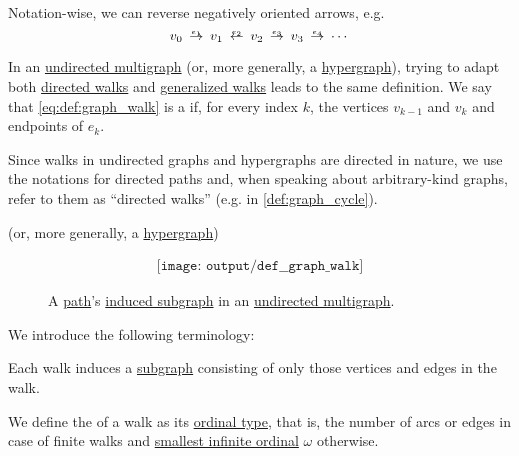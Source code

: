 \begin{definition}
\begin{thmenum}[series=def:graph_walk]
    Notation-wise, we can reverse negatively oriented arrows, e.g.
    \begin{equation*}
      v_0 \reloset {e_1} \to v_1 \reloset {e_2} \leftarrow v_2 \reloset {e_3} \to v_3 \reloset {e_4} \to \cdots
    \end{equation*}

     In an \hyperref[def:hypergraph/multigraph]{undirected multigraph} (or, more generally, a \hyperref[def:hypergraph]{hypergraph}), trying to adapt both \hyperref[def:graph_walk/directed]{directed walks} and \hyperref[def:graph_walk/generalized]{generalized walks} leads to the same definition. We say that \eqref{eq:def:graph_walk} is a  if, for every index \( k \), the vertices \( v_{k-1} \) and \( v_k \) and endpoints of \( e_k \).

    Since walks in undirected graphs and hypergraphs are directed in nature, we use the notations for directed paths and, when speaking about arbitrary-kind graphs, refer to them as \enquote{directed walks} (e.g. in \cref{def:graph_cycle}).

    (or, more generally, a \hyperref[def:hypergraph]{hypergraph})
  \end{thmenum}

  \begin{figure}[!ht]
    \begin{equation}\label{eq:fig:def:graph_walk}
      \begin{aligned}
        \texttt{[image: output/def\_\_graph\_walk]}
      \end{aligned}
    \end{equation}
    \caption{A \hyperref[def:graph_walk/path]{path}'s \hyperref[def:graph_walk/subgraph]{induced subgraph} in an \hyperref[def:hypergraph/multigraph]{undirected multigraph}.}\label{fig:def:graph_walk}
  \end{figure}

  We introduce the following terminology:
  \begin{thmenum}[resume=def:graph_walk]
     Each walk induces a \hyperref[def:directed_multigraph/subgraph]{subgraph} consisting of only those vertices and edges in the walk.

     We define the  of a walk as its \hyperref[thm:well_ordered_order_type_existence]{ordinal type}, that is, the number of arcs or edges in case of finite walks and \hyperref[thm:omega_is_an_ordinal]{smallest infinite ordinal} \( \omega \) otherwise.


\end{thmenum}
\end{definition}
